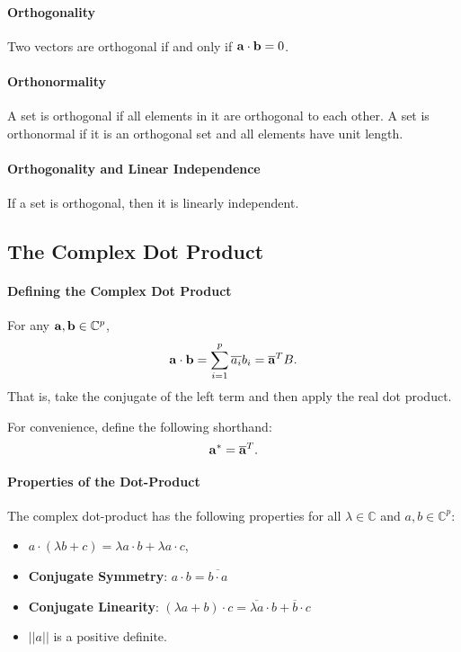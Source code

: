 \paragraph{Orthogonality}
Two vectors are orthogonal if and only if \( \mathbf{a} \cdot \mathbf{b} = 0 \).

\paragraph{Orthonormality}
A set is orthogonal if all elements in it are orthogonal to each other.
A set is orthonormal if it is an orthogonal set and all elements have
unit length.

\paragraph{Orthogonality and Linear Independence}
If a set is orthogonal, then it is linearly independent.

% 
% 
%
\subsection{The Complex Dot Product}

\paragraph{Defining the Complex Dot Product}
For any \( \mathbf{a}, \mathbf{b} \in \mathbb{C}^p \), \[
    \mathbf{a} \cdot \mathbf{b} = \sum_{i=1}^p \overline{a_i} b_i = \overline{\mathbf{a}}^{T}B.
\]
That is, take the conjugate of the left term and then apply the real dot
product.

For convenience, define the following shorthand: \[
    \mathbf{a}^* = \overline{\mathbf{a}}^T.
\]

\paragraph{Properties of the Dot-Product}
The complex dot-product has the following properties for all \( \lambda \in \mathbb{C} \)
and \( a, b \in \mathbb{C}^p \):
\begin{itemize}
    \item \( a\cdot (\lambda b + c) = \lambda a\cdot b + \lambda a \cdot c \),
    \item \textbf{Conjugate Symmetry}: \( a\cdot b = \overline{b \cdot a} \)
    \item \textbf{Conjugate Linearity}:
        \( (\lambda a + b) \cdot c  = \overline{\lambda a} \cdot b  + \overline{b} \cdot c\)
    \item \( ||a|| \) is a positive definite.
\end{itemize}

